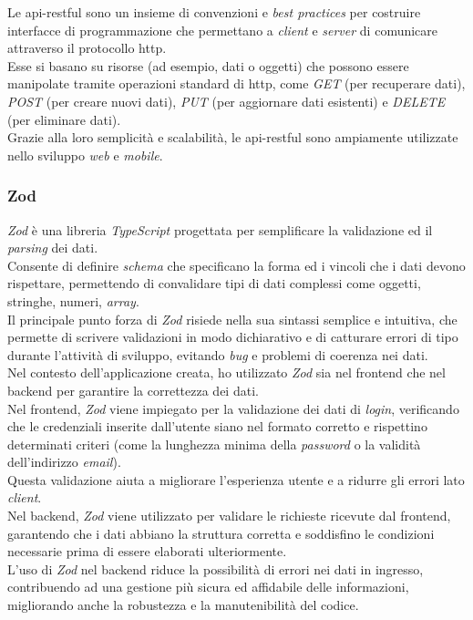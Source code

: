 \noindent Le \gls{api-restful} sono un insieme di convenzioni e \textit{best practices} per costruire interfacce di programmazione che permettano a \textit{client} e \textit{server} di comunicare attraverso il protocollo \gls{http}.\\
Esse si basano su risorse (ad esempio, dati o oggetti) che possono essere manipolate tramite operazioni standard di \gls{http}, come \textit{GET} (per recuperare dati), \textit{POST} (per creare nuovi dati), \textit{PUT} (per aggiornare dati esistenti) e \textit{DELETE} (per eliminare dati).\\
Grazie alla loro semplicità e scalabilità, le \gls{api-restful} sono ampiamente utilizzate nello sviluppo \textit{web} e \textit{mobile}.

\subsubsection{Zod}

\textit{Zod} è una libreria \textit{TypeScript} progettata per semplificare la validazione ed il \textit{parsing} dei dati. \\
Consente di definire \textit{schema} che specificano la forma ed i vincoli che i dati devono rispettare, permettendo di convalidare tipi di dati complessi come oggetti, stringhe, numeri, \textit{array}.\\
Il principale punto forza di \textit{Zod} risiede nella sua sintassi semplice e intuitiva, che permette di scrivere validazioni in modo dichiarativo e di catturare errori di tipo durante l'attività di sviluppo, evitando \textit{bug} e problemi di coerenza nei dati.\\

\noindent Nel contesto dell'applicazione creata, ho utilizzato \textit{Zod} sia nel \gls{frontend} che nel \gls{backend} per garantire la correttezza dei dati.\\
Nel \gls{frontend}, \textit{Zod} viene impiegato per la validazione dei dati di \textit{login}, verificando che le credenziali inserite dall'utente siano nel formato corretto e rispettino determinati criteri (come la lunghezza minima della \textit{password} o la validità dell'indirizzo \textit{email}).\\
Questa validazione aiuta a migliorare l'esperienza utente e a ridurre gli errori lato \textit{client}.\\

\noindent Nel \gls{backend}, \textit{Zod} viene utilizzato per validare le richieste ricevute dal \gls{frontend}, garantendo che i dati abbiano la struttura corretta e soddisfino le condizioni necessarie prima di essere elaborati ulteriormente.\\
L'uso di \textit{Zod} nel \gls{backend} riduce la possibilità di errori nei dati in ingresso, contribuendo ad una gestione più sicura ed affidabile delle informazioni, migliorando anche la robustezza e la manutenibilità del codice.

